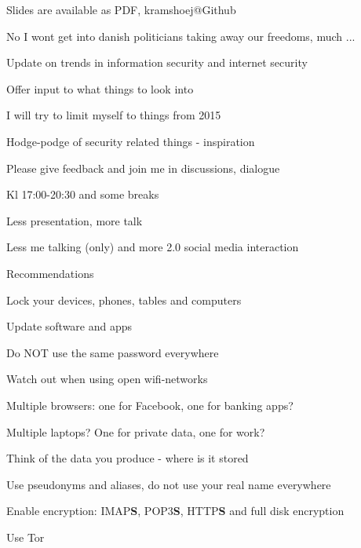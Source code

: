 \documentclass[20pt,landscape,a4paper,footrule]{foils}
\begin{document}


\vskip 2cm
\centerline{\tiny Slides are available as PDF, kramshoej@Github}

No I wont get into danish politicians taking away our freedoms, much ...



\begin{list1}
\item Update on trends in information security and internet security
\item Offer input to what things to look into
\item I will try to limit myself to things from 2015
\item Hodge-podge of security related things - inspiration 
\item Please give feedback and join me in discussions, dialogue \smiley
\end{list1}



\begin{list1}
\item Kl 17:00-20:30 and some breaks
\item Less presentation, more talk 
\item Less me talking (only) and more 2.0 social media interaction
\end{list1}


Recommendations 
\begin{list2}
\item Lock your devices, phones, tables and computers
\item Update software and apps
\item Do NOT use the same password everywhere
\item Watch out when using open wifi-networks
\item Multiple browsers: one for Facebook, one for banking apps?
\item Multiple laptops? One for private data, one for work?
\item Think of the data you produce - where is it stored
\item Use pseudonyms and aliases, do not use your real name everywhere
\item Enable encryption: IMAP{\bf S}, POP3{\bf S},
  HTTP{\bf S} and full disk encryption
\item Use Tor 
\end{list2}
\end{document}
